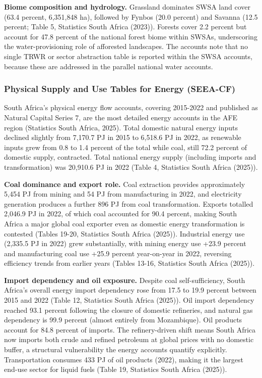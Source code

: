 \documentclass[
  letterpaper,
  DIV=11,
  numbers=noendperiod]{scrartcl}
\begin{document}
\textbf{Biome composition and hydrology.} Grassland dominates SWSA land
cover (63.4 percent, 6,351,848 ha), followed by Fynbos (20.0 percent)
and Savanna (12.5 percent; Table 5, Statistics South Africa (2023)).
Forests cover 2.2 percent but account for 47.8 percent of the national
forest biome within SWSAs, underscoring the water-provisioning role of
afforested landscapes. The accounts note that no single TRWR or sector
abstraction table is reported within the SWSA accounts, because these
are addressed in the parallel national water accounts.

\subsubsection{Physical Supply and Use Tables for Energy
(SEEA-CF)}\label{physical-supply-and-use-tables-for-energy-seea-cf}

South Africa's physical energy flow accounts, covering 2015-2022 and
published as Natural Capital Series 7, are the most detailed energy
accounts in the AFE region (Statistics South Africa, 2025). Total
domestic natural energy inputs declined slightly from 7,170.7 PJ in 2015
to 6,518.6 PJ in 2022, as renewable inputs grew from 0.8 to 1.4 percent
of the total while coal, still 72.2 percent of domestic supply,
contracted. Total national energy supply (including imports and
transformation) was 20,910.6 PJ in 2022 (Table 4, Statistics South
Africa (2025)).

\textbf{Coal dominance and export role.} Coal extraction provides
approximately 5,454 PJ from mining and 54 PJ from manufacturing in 2022,
and electricity generation produces a further 896 PJ from coal
transformation. Exports totalled 2,046.9 PJ in 2022, of which coal
accounted for 90.4 percent, making South Africa a major global coal
exporter even as domestic energy transformation is contested (Tables
19-20, Statistics South Africa (2025)). Industrial energy use (2,335.5
PJ in 2022) grew substantially, with mining energy use +23.9 percent and
manufacturing coal use +25.9 percent year-on-year in 2022, reversing
efficiency trends from earlier years (Tables 13-16, Statistics South
Africa (2025)).

\textbf{Import dependency and oil exposure.} Despite coal
self-sufficiency, South Africa's overall energy import dependency rose
from 17.5 to 19.9 percent between 2015 and 2022 (Table 12, Statistics
South Africa (2025)). Oil import dependency reached 93.1 percent
following the closure of domestic refineries, and natural gas dependency
is 99.9 percent (almost entirely from Mozambique). Oil products account
for 84.8 percent of imports. The refinery-driven shift means South
Africa now imports both crude and refined petroleum at global prices
with no domestic buffer, a structural vulnerability the energy accounts
quantify explicitly. Transportation consumes 433 PJ of oil products
(2022), making it the largest end-use sector for liquid fuels (Table 19,
Statistics South Africa (2025)).
\end{document}
